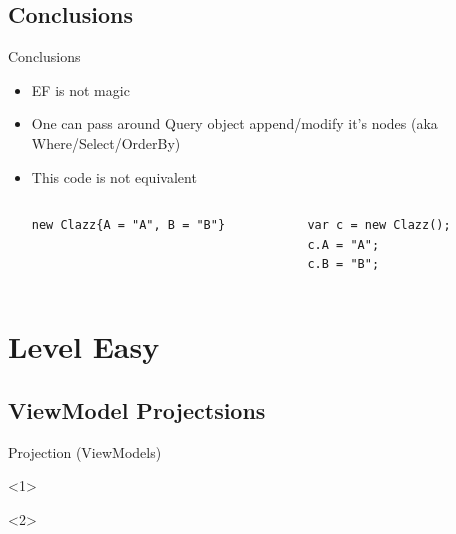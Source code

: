 \documentclass{bredelebeamer}
\begin{document}
\subsection*{Conclusions}
\begin{frame}[fragile]{Conclusions}
    \begin{itemize}
        \item<1-> EF is not magic
        \item<2-> One can pass around Query object append/modify it's nodes (aka Where/Select/OrderBy)
        \item<3-> { This code is not equivalent
        \begin{columns}
            \begin{column}{0.5\textwidth}
                \begin{lstlisting}
new Clazz{A = "A", B = "B"}
                \end{lstlisting}
            \end{column}
            \begin{column}{0.5\textwidth}
                \begin{lstlisting}
var c = new Clazz();
c.A = "A";
c.B = "B";
                \end{lstlisting}
            \end{column}
        \end{columns}
        }
    \end{itemize}
\end{frame}

\section{Level Easy}
\subsection{ViewModel Projectsions}
\begin{frame}{Projection (ViewModels)}
    \begin{onlyenv}<1>
        
    \end{onlyenv}
    \begin{onlyenv}<2>
        
    \end{onlyenv}
\end{frame}
\end{document}
